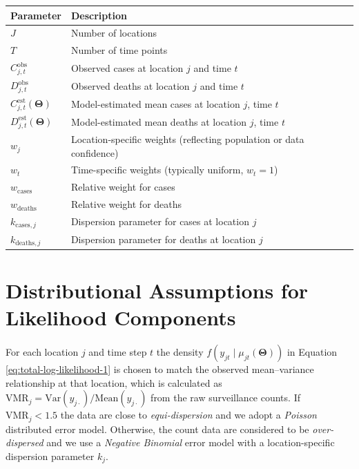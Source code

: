 \documentclass[
]{book}
\begin{document}
\begin{longtable}[]{@{}
  >{\raggedright\arraybackslash}p{}
  >{\raggedright\arraybackslash}p{}@{}}
\toprule\noalign{}
\begin{minipage}[b]{\linewidth}\raggedright
Parameter
\end{minipage} & \begin{minipage}[b]{\linewidth}\raggedright
Description
\end{minipage} \\
\midrule\noalign{}
\endhead
\bottomrule\noalign{}
\endlastfoot
\(J\) & Number of locations \\
\(T\) & Number of time points \\
\(C_{j,t}^{\text{obs}}\) & Observed cases at location \(j\) and time \(t\) \\
\(D_{j,t}^{\text{obs}}\) & Observed deaths at location \(j\) and time \(t\) \\
\(C_{j,t}^{\text{est}}(\boldsymbol{\Theta})\) & Model-estimated mean cases at location \(j\), time \(t\) \\
\(D_{j,t}^{\text{est}}(\boldsymbol{\Theta})\) & Model-estimated mean deaths at location \(j\), time \(t\) \\
\(w_j\) & Location-specific weights (reflecting population or data confidence) \\
\(w_t\) & Time-specific weights (typically uniform, \(w_t=1\)) \\
\(w_{\text{cases}}\) & Relative weight for cases \\
\(w_{\text{deaths}}\) & Relative weight for deaths \\
\(k_{\text{cases}, j}\) & Dispersion parameter for cases at location \(j\) \\
\(k_{\text{deaths}, j}\) & Dispersion parameter for deaths at location \(j\) \\
\end{longtable}

\section{Distributional Assumptions for Likelihood Components}\label{distributional-assumptions-for-likelihood-components}

For each location \(j\) and time step \(t\) the density \(f\!\left(y_{jt}\mid\mu_{jt}\left(\boldsymbol{\Theta}\right)\right)\) in Equation
\eqref{eq:total-log-likelihood-1} is chosen to match the observed mean--variance relationship at that location, which is
calculated as \(\mathrm{VMR}_j = \mathrm{Var}(y_{j\cdot}) / \mathrm{Mean}(y_{j\cdot})\) from the raw surveillance counts.
If \(\mathrm{VMR}_j < 1.5\) the data are close to \emph{equi-dispersion} and we adopt a \emph{Poisson} distributed error model. Otherwise,
the count data are considered to be \emph{over-dispersed} and we use a \emph{Negative Binomial} error model with a location-specific dispersion
parameter \(k_j\).
\end{document}
